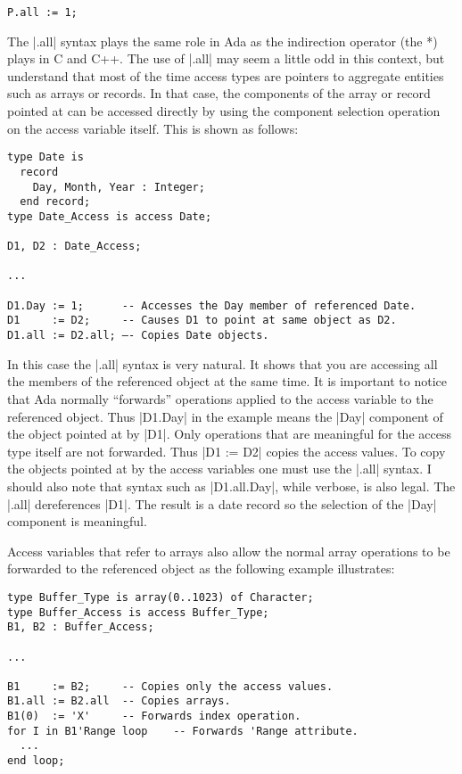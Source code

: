 \begin{lstlisting}
P.all := 1;
\end{lstlisting}

The |.all| syntax plays the same role in Ada as the indirection operator (the *) plays in C and
C++. The use of |.all| may seem a little odd in this context, but understand that most of the
time access types are pointers to aggregate entities such as arrays or records. In that case,
the components of the array or record pointed at can be accessed directly by using the component
selection operation on the access variable itself. This is shown as follows:

\begin{lstlisting}
type Date is
  record
    Day, Month, Year : Integer;
  end record;
type Date_Access is access Date;

D1, D2 : Date_Access;

...

D1.Day := 1;      -- Accesses the Day member of referenced Date.
D1     := D2;     -- Causes D1 to point at same object as D2.
D1.all := D2.all; –- Copies Date objects.
\end{lstlisting}

In this case the |.all| syntax is very natural. It shows that you are accessing all the members
of the referenced object at the same time. It is important to notice that Ada normally
``forwards'' operations applied to the access variable to the referenced object. Thus |D1.Day|
in the example means the |Day| component of the object pointed at by |D1|. Only operations that
are meaningful for the access type itself are not forwarded. Thus |D1 := D2| copies the access
values. To copy the objects pointed at by the access variables one must use the |.all| syntax. I
should also note that syntax such as |D1.all.Day|, while verbose, is also legal. The |.all|
dereferences |D1|. The result is a date record so the selection of the |Day| component is
meaningful.

Access variables that refer to arrays also allow the normal array operations to be forwarded to
the referenced object as the following example illustrates:

\begin{lstlisting}
type Buffer_Type is array(0..1023) of Character;
type Buffer_Access is access Buffer_Type;
B1, B2 : Buffer_Access;

...

B1     := B2;     -- Copies only the access values.
B1.all := B2.all  -- Copies arrays.
B1(0)  := 'X'     -- Forwards index operation.
for I in B1'Range loop    -- Forwards 'Range attribute.
  ...
end loop;
\end{lstlisting}

